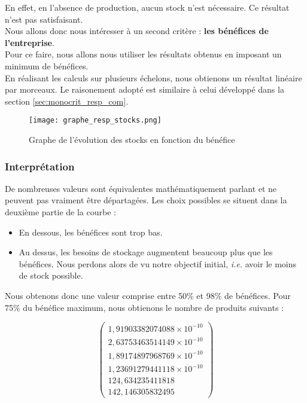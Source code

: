 En effet, en l'absence de production, aucun stock n'est nécessaire. Ce résultat
n'est pas satisfaisant.\\
Nous allons donc nous intéresser à un second critère : \textbf{les bénéfices de l'entreprise}.\\
Pour ce faire, nous allons nous utiliser les résultats obtenus en imposant un minimum de bénéfices.\\
En réalisant les calculs sur plusieurs échelons, nous obtienons un résultat linéaire par morceaux. Le
raisonement adopté est similaire à celui développé dans la section \ref{sec:monocrit_resp_com}.

\begin{figure}[!ht]
	\texttt{[image: graphe\_resp\_stocks.png]}
	\caption{Graphe de l'évolution des stocks en fonction du bénéfice}
\end{figure}

\subsubsection{Interprétation} 
De nombreuses valeurs sont équivalentes mathématiquement parlant et ne peuvent pas vraiment être départagées. 
Les choix possibles se situent dans la deuxième partie de la courbe :
\begin{itemize}
	\item En dessous, les bénéfices sont trop bas.
	\item Au dessus, les besoins de stockage augmentent beaucoup plus que les bénéfices. Nous perdons alors de vu notre
	objectif initial, \textsl{i.e.} avoir le moins de stock possible.
\end{itemize}

Nous obtenons donc une valeur comprise entre 50\% et 98\% de bénéfices. 
Pour 75\% du bénéfice maximum, nous obtienons le nombre de produits suivants :

\begin{equation}
\begin{pmatrix}
1,91903382074088 \times 10^{-10} \\
2,63753463514149 \times 10^{-10} \\ 
1,89174897968769 \times 10^{-10} \\
1,23691279441118 \times 10^{-10} \\ 
124,634235411818 \\
142,146305832495 
\end{pmatrix}
\end{equation}

